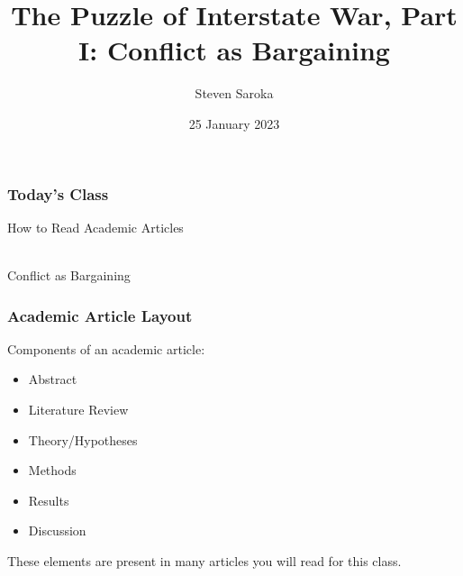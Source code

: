 \documentclass{beamer}
\title[The Puzzle of War (I)]{\LARGE{The Puzzle of Interstate War, Part I: Conflict as Bargaining}}
\author[POLI 150]{Steven Saroka}
\institute{POLI 150}
\date{25 January 2023}
\begin{document}
\begin{frame}
\titlepage %
\end{frame}









\begin{frame} 
	\frametitle{\LARGE{Today's Class}}
	\begin{itemize}
		\Large{
			\item How to Read Academic Articles
			\\~\\ 
			\item Conflict as Bargaining
		}
	\end{itemize}
\end{frame}

\begin{frame} 
	\frametitle{\LARGE{Academic Article Layout}}
	Components of an academic article:
	\begin{itemize}
		\item Abstract
		\item Literature Review
		\item Theory/Hypotheses
		\item Methods
		\item Results
		\item Discussion
	\end{itemize}
	These elements are present in many articles you will read for this class.
\end{frame}
\end{document}

